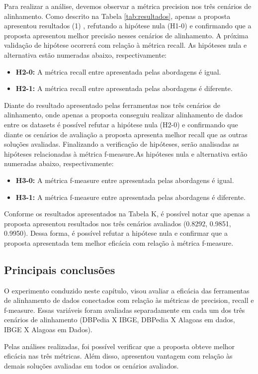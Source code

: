 Para realizar a análise, devemos observar a métrica precision nos três cenários de alinhamento. Como descrito na Tabela \ref{tab:resultados}, apenas a proposta apresentou resultados (1) , refutando a hipótese nula (H1-0) e confirmando que a proposta apresentou melhor precisão nesses cenários de alinhamento.
A próxima validação de hipótese ocorrerá com relação à métrica recall. As hipóteses nula e alternativa estão numeradas abaixo, respectivamente:

\begin{itemize}
\item \textbf{H2-0:} A métrica recall entre apresentada pelas abordagens é igual.
\item \textbf{H2-1:} A métrica recall entre apresentada pelas abordagens é diferente.
\end{itemize}

Diante do resultado apresentado pelas ferramentas nos três cenários de alinhamento, onde apenas a proposta conseguiu realizar alinhamento de dados entre os datasets é possível refutar a hipótese nula (H2-0) e confirmando que diante os cenários de avaliação a proposta apresenta melhor recall que as outras soluções avaliadas.
Finalizando a verificação de hipóteses, serão analisadas as hipóteses relacionadas à métrica f-measure.As hipóteses nula e alternativa estão numeradas abaixo, respectivamente:

\begin{itemize}
\item \textbf{H3-0:} A métrica f-measure entre apresentada pelas abordagens é igual.
\item \textbf{H3-1:} A métrica f-measure entre apresentada pelas abordagens é diferente.
\end{itemize}

Conforme os resultados apresentados na Tabela K, é possível notar que apenas a proposta apresentou resultados nos três cenários avaliados (0.8292, 0.9851, 0.9950). Dessa forma, é possível refutar a hipótese nula e confirmar que a proposta apresentada tem melhor eficácia com relação à métrica f-measure. 


\subsection{Principais conclusões}
O experimento conduzido neste capítulo, visou avaliar a eficácia das ferramentas de alinhamento de dados conectados com relação às métricas de precision, recall e f-measure. Essas variáveis foram avaliadas separadamente em cada um dos três cenários de alinhamento (DBPedia X IBGE, DBPedia X Alagoas em dados, IBGE X Alagoas em Dados).

Pelas análises realizadas, foi possível verificar que a proposta obteve melhor eficácia nas três métricas. Além disso, apresentou vantagem com relação às demais soluções avaliadas em todos os cenários avaliados.
